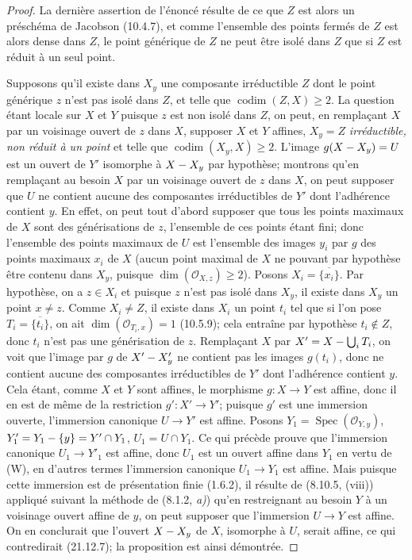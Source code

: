 \begin{proof}
La dernière assertion de l'énoncé résulte de ce que $Z$ est alors un préschéma de
Jacobson (10.4.7), et comme l'ensemble des points fermés de $Z$ est alors dense dans
$Z$, le point générique de $Z$ ne peut être isolé dans $Z$ que si $Z$ est réduit à un
seul point.

Supposons qu'il existe dans $X_y$ une composante irréductible $Z$ dont le point
générique $z$ n'est pas isolé dans $Z$, et telle que $\operatorname{codim}(Z,X)\geq2$.
La question étant locale
sur $X$ et $Y$ puisque $z$ est non isolé dans $Z$, on peut, en
remplaçant $X$ par un voisinage ouvert de $z$ dans $X$, supposer $X$ et $Y$ affines,
$X_y=Z$ \emph{irréductible, non réduit à un point} et telle que
$\operatorname{codim}(X_y,X)\geq2$. L'image $g(X- X_y)=U$ est un ouvert de $Y'$
isomorphe à $X- X_y$ par hypothèse; montrons qu'en remplaçant au besoin $X$ par un
voisinage ouvert de $z$ dans $X$, on peut supposer que $U$ ne contient aucune des
composantes irréductibles de $Y'$ dont l'adhérence contient $y$.
En effet, on peut tout d'abord supposer que tous les points maximaux de $X$ sont des
générisations de $z$, l'ensemble de ces points étant fini; donc l'ensemble des points
maximaux de $U$ est l'ensemble des images $y_i$ par $g$ des points maximaux $x_i$ de
$X$ (aucun point maximal de $X$ ne pouvant par hypothèse être contenu dans $X_y$,
puisque $\dim(\mathcal O_{X,z})\geq2$). Posons $X_i=\overline{\{x_i\}}$. Par
hypothèse, on a $z\in X_i$ et puisque $z$ n'est pas isolé dans $X_y$, il existe dans
$X_y$ un point $x\ne z$. Comme $X_i\ne Z$, il existe dans $X_i$ un point $t_i$ tel
que si l'on pose $T_i=\overline{\{t_i\}}$, on ait $\dim(\mathcal O_{T_i,x})=1$
(10.5.9); cela entraîne par hypothèse $t_i\notin Z$, donc $t_i$ n'est pas une
générisation de $z$. Remplaçant $X$ par $X'=X-\bigcup_iT_i$, on voit que l'image par
$g$ de $X'- X'_y$ ne contient pas les images $g(t_i)$, donc ne contient aucune des
composantes irréductibles de $Y'$ dont l'adhérence contient $y$.
Cela étant, comme $X$ et $Y$ sont affines, le morphisme $g:X\to Y$ est affine, donc il
en est de même de la restriction $g':X'\to Y'$; puisque $g'$ est une immersion ouverte,
l'immersion canonique $U\to Y'$ est affine. Posons
$Y_1=\operatorname{Spec}(\mathcal O_{Y,y})$, $Y'_1=Y_1-\{y\}=Y'\cap Y_1$,
$U_1=U\cap Y_1$. Ce qui précède prouve que l'immersion canonique $U_1\to Y'_1$ est
affine, donc $U_1$ est un ouvert affine dans $Y_1$ en vertu de (W), en d'autres termes
l'immersion canonique $U_1\to Y_1$ est affine. Mais puisque cette immersion est de
présentation finie (1.6.2), il résulte de (8.10.5, (viii)) appliqué suivant la méthode de
(8.1.2, \emph{a)}) qu'en restreignant au besoin $Y$ à un voisinage ouvert affine de $y$, on peut
supposer que l'immersion $U\to Y$ est affine. On en conclurait que l'ouvert $X- X_y$ de
$X$, isomorphe à $U$, serait affine, ce qui contredirait (21.12.7); la proposition est
ainsi démontrée.
\end{proof}

